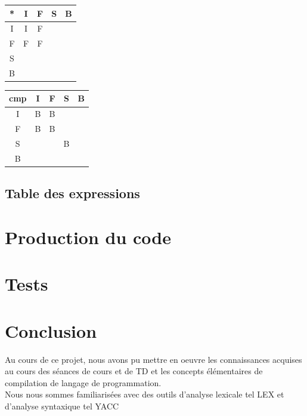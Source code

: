 \documentclass{article}
\begin{document}
\begin{center}
\begin{tabular}{|c|c|c|c|c|}
  \hline
  * & I & F & S & B \\
  \hline
  I & I & F &   &  \\
  \hline
  F & F & F &   & \\
  \hline
  S &   &   &  & \\
  \hline
  B & & & & \\
\hline
\end{tabular}
\end{center}



\begin{center}
\begin{tabular}{|c|c|c|c|c|}
  \hline
  cmp & I & F & S & B \\
  \hline
  I & B & B &   &  \\
  \hline
  F & B & B &   & \\
  \hline
  S &   &   & B  & \\
  \hline
  B & & & & \\
\hline
\end{tabular}
\end{center}


\subsection{Table des expressions}

\section{Production du code}

\section{Tests}

\section*{Conclusion}
Au cours de ce projet, nous avons pu mettre en oeuvre les connaissances acquises au cours des séances de cours et de TD et les concepts élémentaires de compilation de langage de programmation. \\

Nous nous sommes familiarisées avec des outils d'analyse lexicale tel LEX et d'analyse syntaxique tel YACC                                                 
\end{document}

